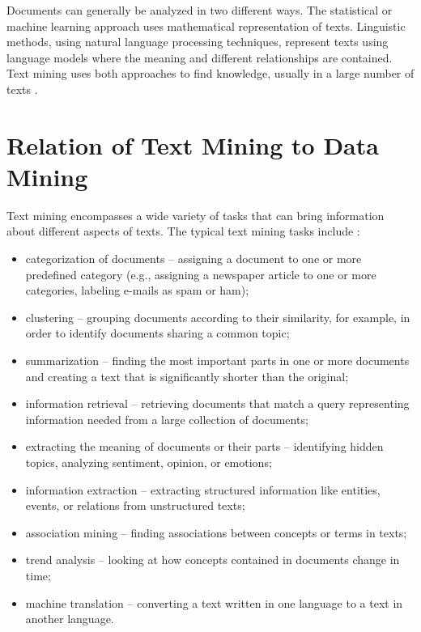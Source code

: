 Documents can generally be analyzed in two different ways. The statistical or
machine learning approach uses mathematical representation of texts. Linguistic methods, using natural language processing techniques, represent texts using
language models where the meaning and different relationships are contained.
Text mining uses both approaches to find knowledge, usually in a large number
of texts \cite{ref254,ref271}.

\section{Relation of Text Mining to Data Mining}

Text mining encompasses a wide variety of tasks that can bring information about
different aspects of texts. The typical text mining tasks include \cite{ref196,ref279,ref123}:

\begin{itemize}
    \item categorization of documents – assigning a document to one or more predefined category (e.g., assigning a newspaper article to one or more categories, labeling e-mails as spam or ham);
    
    \item clustering – grouping documents according to their similarity, for example, in order to identify documents sharing a common topic;

    \item summarization – finding the most important parts in one or more documents and creating a text that is significantly shorter than the original;

    \item information retrieval – retrieving documents that match a query representing information needed from a large collection of documents;

    \item extracting the meaning of documents or their parts – identifying hidden topics, analyzing sentiment, opinion, or emotions;

    \item  information extraction – extracting structured information like entities, events, or relations from unstructured texts;

    \item association mining – finding associations between concepts or terms in texts;

    \item  trend analysis – looking at how concepts contained in documents change in time;

    \item  machine translation – converting a text written in one language to a text in another language.
\end{itemize}

